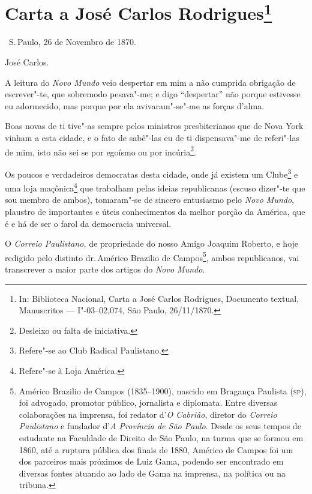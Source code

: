 \chapter{Carta a José Carlos Rodrigues\footnote[*]{In: Biblioteca
  Nacional, Carta a José Carlos Rodrigues, Documento textual,
  Manuscritos --- I"-03--02,074, São Paulo, 26/11/1870.}}


\hfill\ S.\,Paulo, 26 de Novembro de 1870.\medskip

\noindent{}José Carlos.\smallskip

A leitura do \emph{Novo Mundo} veio despertar em mim a não cumprida
obrigação de escrever"-te, que sobremodo pesava"-me; e digo ``despertar''
não porque estivesse eu adormecido, mas porque por ela avivaram"-se"-me as
forças d'alma.

Boas novas de ti tive"-as sempre pelos ministros presbiterianos que de
Nova York vinham a esta cidade, e o fato de sabê"-las eu de ti
dispensava"-me de referi"-las de mim, isto não sei se por egoísmo ou por
incúria\footnote{Desleixo ou falta de iniciativa.}.

Os poucos e verdadeiros democratas desta cidade, onde já existem um
Clube\footnote{Refere"-se ao Club Radical Paulistano.} e uma loja
maçônica\footnote{Refere"-se à Loja América.} que trabalham pelas
ideias republicanas (escuso dizer"-te que sou membro de ambos),
tomaram"-se de sincero entusiasmo pelo \emph{Novo Mundo}, plaustro de
importantes e úteis conhecimentos da melhor porção da América, que é e
há de ser o farol da democracia universal.

O \emph{Correio Paulistano,} de propriedade do nosso Amigo Joaquim
Roberto, e hoje redigido pelo distinto dr.\,Américo Brazilio de
Campos\footnote{Américo Brazilio de Campos (1835--1900), nascido em
  Bragança Paulista (\textsc{sp}), foi advogado, promotor público, jornalista e
  diplomata. Entre diversas colaborações na imprensa, foi redator
  d'\emph{O Cabrião}, diretor do \emph{Correio Paulistano} e fundador
  d'\emph{A Província de São Paulo}. Desde os seus tempos de estudante
  na Faculdade de Direito de São Paulo, na turma que se formou em 1860,
  até a ruptura pública dos finais de 1880, Américo de Campos foi um dos
  parceiros mais próximos de Luiz Gama, podendo ser encontrado em
  diversas fontes atuando ao lado de Gama na imprensa, na política ou na
  tribuna.}, ambos republicanos, vai transcrever a maior parte dos
artigos do \emph{Novo Mundo}.

